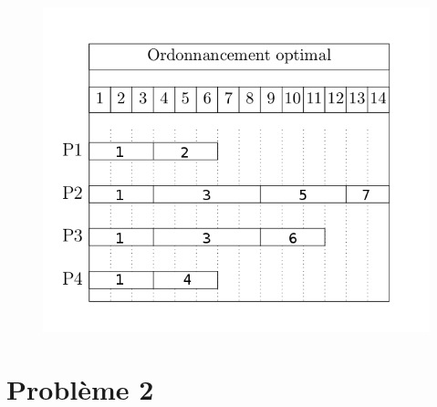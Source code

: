 \documentclass[12pt]{article}
\begin{document}
\begin{figure}[H]
  \includegraphics[width=14cm]{gantt.png}
\end{figure}

\section{Problème 2}
\end{document}

